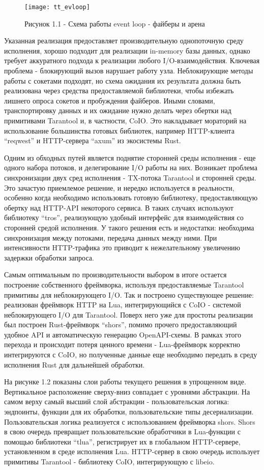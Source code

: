 \documentclass[times,numbers=noenddot]{itmo-student-thesis}
\begin{document}
\begin{figure}[!h]
	\caption*{Рисунок 1.1 - Схема работы event loop - файберы и арена}\label{fig1}
	\centering
	\texttt{[image: tt\_evloop]}
\end{figure}


Указанная реализация предоставляет производительную однопоточную среду исполнения, хорошо подходит для реализации in-memory базы данных, однако требует аккуратного подхода к реализации любого I/O-взаимодействия.
Ключевая проблема - блокирующий вызов нарушает работу узла.
Неблокирующие методы работы с сокетами подходят, но схема ожидания их результата должна быть реализована через средства предоставляемой библиотеки, чтобы избежать лишнего опроса сокетов и пробуждения файберов.
Иными словами, транспортировку данных и их ожидание нужно делать через обертки над примитивами Tarantool и, в частности, CoIO.
Это накладывает мораторий на использование большинства готовых библиотек, например HTTP-клиента “reqwest” и HTTP-сервера “axum” из экосистемы Rust.

Одним из обходных путей является поднятие сторонней среды исполнения - еще одного набора потоков, и делегирование I/O работы на них.
Возникает проблема синхронизации двух сред исполнения - TX-потока Tarantool и сторонней среды.
Это зачастую приемлемое решение, и нередко используется в реальности, особенно когда необходимо использовать готовую библиотеку, предоставляющую обертку над HTTP-API некоторого сервиса.
В таких случаях используют библиотеку “tros”, реализующую удобный интерфейс для взаимодействия со сторонней средой исполнения.
У такого решения есть и недостатки: необходима синхронизация между потоками, передача данных между ними.
При интенсивности HTTP-трафика это приводит к нежелательному увеличению задержки обработки запроса.

Самым оптимальным по производительности выбором в итоге остается построение собственного фреймворка, используя предоставляемые Tarantool примитивы для неблокирующего I/O.
Так и построено существующее решение: реализован фреймворк HTTP на Lua, интегрирующийся с CoIO - системой неблокирующего I/O для Tarantool.
Поверх него уже для простоты реализации был построен Rust-фреймворк “shors”, помимо прочего предоставляющий удобное API и автоматическую генерацию OpenAPI-схемы.
В рамках этого перехода и происходит потеря ценного времени - Lua-фреймворк корректно интегрируются с CoIO, но полученные данные еще необходимо передать в среду исполнения Rust для дальнейшей обработки.

На рисунке 1.2 показаны слои работы текущего решения в упрощенном виде.
Вертикальное расположение сверху-вниз совпадает с уровнями абстракции.
На самом верху самый высший слой абстракции - пользовательская логика: эндпоинты, функции для их обработки, пользовательские типы десериализации.
Пользовательская логика реализуется с использованием фреймворка shors.
Shors в свою очередь превращает пользовательские обработчики в Lua-функции с помощью библиотеки “tlua”, регистрирует их в глобальном HTTP-сервере, установленном в среде исполнения Lua.
HTTP-сервер в свою очередь использует примитивы Tarantool - библиотеку CoIO, интегрирующую с libeio.
\end{document}
